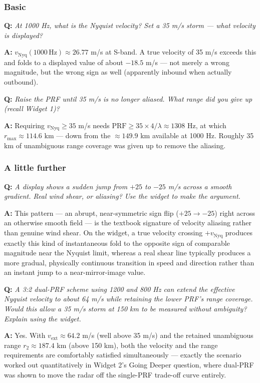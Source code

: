 \documentclass[11pt]{article}
\newenvironment{qa}[1]{\par\noindent\textbf{\color{qgray}Q: }\emph{#1}\par\noindent\textbf{A: }}{\par\vspace{6pt}}
\newcommand{\tier}[1]{\subsubsection*{#1}}
\begin{document}
\tier{Basic}
\begin{qa}{At 1000 Hz, what is the Nyquist velocity? Set a 35 m/s storm --- what velocity is displayed?}
$v_{\mathrm{Nyq}}(1000\,\mathrm{Hz})\approx26.77$ m/s at S-band. A true velocity of 35 m/s exceeds this and folds to a displayed value of about $-18.5$ m/s --- not merely a wrong magnitude, but the wrong sign as well (apparently inbound when actually outbound).
\end{qa}
\begin{qa}{Raise the PRF until 35 m/s is no longer aliased. What range did you give up (recall Widget 1)?}
Requiring $v_{\mathrm{Nyq}}\ge35$ m/s needs $\mathrm{PRF}\ge35\times4/\lambda\approx1308$ Hz, at which $r_{\max}\approx114.6$ km --- down from the $\approx149.9$ km available at 1000 Hz. Roughly 35 km of unambiguous range coverage was given up to remove the aliasing.
\end{qa}

\tier{A little further}
\begin{qa}{A display shows a sudden jump from $+25$ to $-25$ m/s across a smooth gradient. Real wind shear, or aliasing? Use the widget to make the argument.}
This pattern --- an abrupt, near-symmetric sign flip ($+25\to-25$) right across an otherwise smooth field --- is the textbook signature of velocity aliasing rather than genuine wind shear. On the widget, a true velocity crossing $+v_{\mathrm{Nyq}}$ produces exactly this kind of instantaneous fold to the opposite sign of comparable magnitude near the Nyquist limit, whereas a real shear line typically produces a more gradual, physically continuous transition in speed and direction rather than an instant jump to a near-mirror-image value.
\end{qa}
\begin{qa}{A 3:2 dual-PRF scheme using 1200 and 800 Hz can extend the effective Nyquist velocity to about 64 m/s while retaining the lower PRF's range coverage. Would this allow a 35 m/s storm at 150 km to be measured without ambiguity? Explain using the widget.}
Yes. With $v_{\mathrm{ext}}\approx64.2$ m/s (well above 35 m/s) and the retained unambiguous range $r_2\approx187.4$ km (above 150 km), both the velocity and the range requirements are comfortably satisfied simultaneously --- exactly the scenario worked out quantitatively in Widget 2's Going Deeper question, where dual-PRF was shown to move the radar off the single-PRF trade-off curve entirely.
\end{qa}
\end{document}
